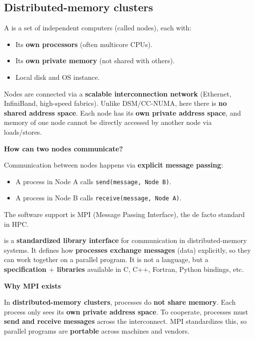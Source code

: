 \subsection{Distributed-memory clusters}

A  is a set of independent computers (called nodes), each with:
\begin{itemize}
    \item Its \textbf{own processors} (often multicore CPUs).
    \item Its \textbf{own private memory} (not shared with others).
    \item Local disk and OS instance.
\end{itemize}
Nodes are connected via a \textbf{scalable interconnection network} (Ethernet, InfiniBand, high-speed fabrics). Unlike DSM/CC-NUMA, here there is \textbf{no shared address space}. Each node has its \textbf{own private address space}, and memory of one node cannot be directly accessed by another node via loads/stores.

\highspace
\begin{flushleft}
    \textcolor{Green3}{ \textbf{How can two nodes communicate?}}
\end{flushleft}
Communication between nodes happens via \textbf{explicit message passing}:
\begin{itemize}
    \item A process in Node A calls \texttt{send(message, Node B)}.
    \item A process in Node B calls \texttt{receive(message, Node A)}.
\end{itemize}
The software support is MPI (Message Passing Interface), the de facto standard in HPC.

\begin{deepeningbox}[: MPI]
     is a \textbf{standardized library interface} for communication in distributed-memory systems. It defines how \textbf{processes exchange messages} (data) explicitly, so they can work together on a parallel program.  It is not a language, but a \textbf{specification $+$ libraries} available in C, C++, Fortran, Python bindings, etc.

    \highspace
    \begin{flushleft}
        \textcolor{Green3}{ \textbf{Why MPI exists}}
    \end{flushleft}
    In \textbf{distributed-memory clusters}, processes do \textbf{not share memory}. Each process only sees its \textbf{own private address space}. To cooperate, processes must \textbf{send and receive messages} across the interconnect. MPI standardizes this, so parallel programs are \textbf{portable} across machines and vendors.
\end{deepeningbox}

